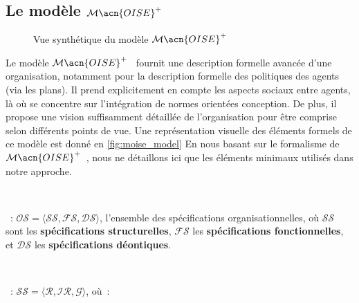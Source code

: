 \subsection{Le modèle $\mathcal{M}\acn{OISE}^+$}

\begin{figure}[h!]
  \centering
  
  \caption{Vue synthétique du modèle $\mathcal{M}\acn{OISE}^+$}
  \label{fig:moise_model}
\end{figure}

Le modèle $\mathcal{M}\acn{OISE}^+$~\citep{Hubner2002} fournit une description formelle avancée d'une organisation, notamment pour la description formelle des politiques des agents (via les plans). Il prend explicitement en compte les aspects sociaux entre agents, là où  se concentre sur l'intégration de normes orientées conception. De plus, il propose une vision suffisamment détaillée de l'organisation pour être comprise selon différents points de vue. Une représentation visuelle des éléments formels de ce modèle est donné en \autoref{fig:moise_model}
En nous basant sur le formalisme de $\mathcal{M}\acn{OISE}^+$~\citep{hubner2007moise}, nous ne détaillons ici que les éléments minimaux utilisés dans notre approche.

\

\noindent \textbf{}~: \quad $\mathcal{OS} = \langle \mathcal{SS}, \mathcal{FS}, \mathcal{DS} \rangle$, l'ensemble des spécifications organisationnelles, où $\mathcal{SS}$ sont les \textbf{spécifications structurelles}, $\mathcal{FS}$ les \textbf{spécifications fonctionnelles}, et $\mathcal{DS}$ les \textbf{spécifications déontiques}.

\

\noindent \textbf{}~: \quad $\mathcal{SS} = \langle \mathcal{R}, \mathcal{IR}, \mathcal{G} \rangle$, où~:

